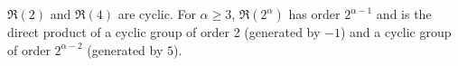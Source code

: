 $\Re(2)$ and $\Re(4)$ are cyclic. For $\alpha \geq 3$, $\Re(2^\alpha)$ has order $2^{\alpha-1}$ and is the direct product of a cyclic group of order 2 (generated by $-1$) and a cyclic group of order $2^{\alpha-2}$ (generated by $5$).
